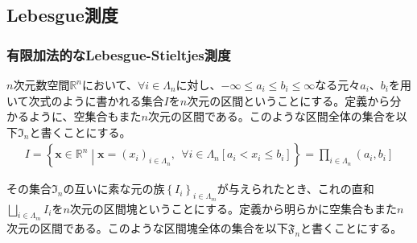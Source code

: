 \documentclass[dvipdfmx]{jsarticle}
\begin{document}
\subsection{Lebesgue測度}%
\subsubsection{有限加法的なLebesgue-Stieltjes測度}%
\begin{dfn}\label{区間}
$n$次元数空間$\mathbb{R}^{n}$において、$\forall i \in \varLambda_{n}$に対し、$- \infty \leq a_{i} \leq b_{i} \leq \infty$なる元々$a_{i}$、$b_{i}$を用いて次式のように書かれる集合$I$を$n$次元の区間ということにする。定義から分かるように、空集合もまた$n$次元の区間である。このような区間全体の集合を以下$\mathfrak{I}_{n}$と書くことにする。
\begin{align*}
I = \left\{ \mathbf{x} \in \mathbb{R}^{n} \middle| \mathbf{x} = \left( x_{i} \right)_{i \in \varLambda_{n}},\ \ \forall i \in \varLambda_{n}\left[ a_{i} < x_{i} \leq b_{i} \right] \right\} = \prod_{i \in \varLambda_{n}} \left( a_{i},b_{i} \right]
\end{align*}
\end{dfn}
\begin{dfn}\label{区間塊}
その集合$\mathfrak{I}_{n}$の互いに素な元の族$\left\{ I_{i} \right\}_{i \in \varLambda_{m} }$が与えられたとき、これの直和$\bigsqcup_{i \in \varLambda_{m} } I_{i}$を$n$次元の区間塊ということにする。定義から明らかに空集合もまた$n$次元の区間である。このような区間塊全体の集合を以下$\mathfrak{F}_{n}$と書くことにする。
\end{dfn}
\end{document}
